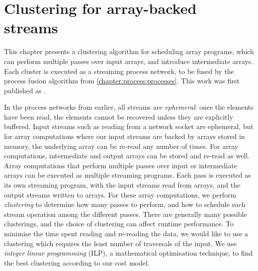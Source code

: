 \chapter{Clustering for array-backed streams}
\label{clustering}



This chapter presents a clustering algorithm for scheduling array programs, which can perform multiple passes over input arrays, and introduce intermediate arrays.
Each cluster is executed as a streaming process network, to be fused by the process fusion algorithm from \cref{chapter:process:processes}.
This work was first published as \citet{robinson2014fusing}.

In the process networks from earlier, all streams are \emph{ephemeral}: once the elements have been read, the elements cannot be recovered unless they are explicitly buffered.
Input streams such as reading from a network socket are ephemeral, but for array computations where our input streams are backed by arrays stored in memory, the underlying array can be re-read any number of times.
For array computations, intermediate and output arrays can be stored and re-read as well.
Array computations that perform multiple passes over input or intermediate arrays can be executed as multiple streaming programs.
Each pass is executed as its own streaming program, with the input streams read from arrays, and the output streams written to arrays.
For these array computations, we perform \emph{clustering} to determine how many passes to perform, and how to schedule each stream operation among the different passes.
There are generally many possible clusterings, and the choice of clustering can affect runtime performance.
To minimise the time spent reading and re-reading the data, we would like to use a clustering which requires the least number of traversals of the input.
We use \emph{integer linear programming} (ILP), a mathematical optimisation technique, to find the best clustering according to our cost model.

